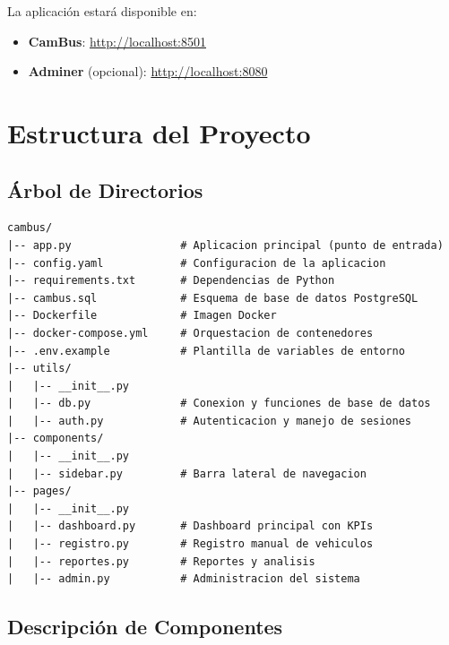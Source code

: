 \documentclass[12pt,a4paper]{article}
\begin{document}
La aplicación estará disponible en:
\begin{itemize}
    \item \textbf{CamBus}: \url{http://localhost:8501}
    \item \textbf{Adminer} (opcional): \url{http://localhost:8080}
\end{itemize}

\section{Estructura del Proyecto}

\subsection{Árbol de Directorios}

\begin{lstlisting}[basicstyle=\ttfamily\footnotesize]
cambus/
|-- app.py                 # Aplicacion principal (punto de entrada)
|-- config.yaml            # Configuracion de la aplicacion
|-- requirements.txt       # Dependencias de Python
|-- cambus.sql             # Esquema de base de datos PostgreSQL
|-- Dockerfile             # Imagen Docker
|-- docker-compose.yml     # Orquestacion de contenedores
|-- .env.example           # Plantilla de variables de entorno
|-- utils/
|   |-- __init__.py
|   |-- db.py              # Conexion y funciones de base de datos
|   |-- auth.py            # Autenticacion y manejo de sesiones
|-- components/
|   |-- __init__.py
|   |-- sidebar.py         # Barra lateral de navegacion
|-- pages/
|   |-- __init__.py
|   |-- dashboard.py       # Dashboard principal con KPIs
|   |-- registro.py        # Registro manual de vehiculos
|   |-- reportes.py        # Reportes y analisis
|   |-- admin.py           # Administracion del sistema
\end{lstlisting}

\subsection{Descripción de Componentes}
\end{document}
